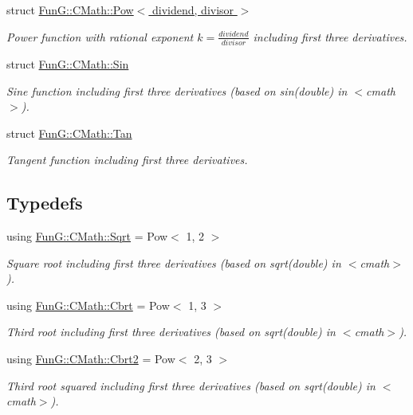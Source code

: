 \begin{DoxyCompactItemize}
struct \hyperlink{structFunG_1_1CMath_1_1Pow}{Fun\-G\-::\-C\-Math\-::\-Pow$<$ dividend, divisor $>$}
\begin{DoxyCompactList}\small\item\em Power function with rational exponent $ k = \frac{dividend}{divisor} $ including first three derivatives. \end{DoxyCompactList}\item 
struct \hyperlink{structFunG_1_1CMath_1_1Sin}{Fun\-G\-::\-C\-Math\-::\-Sin}
\begin{DoxyCompactList}\small\item\em Sine function including first three derivatives (based on sin(double) in $<$cmath$>$). \end{DoxyCompactList}\item 
struct \hyperlink{structFunG_1_1CMath_1_1Tan}{Fun\-G\-::\-C\-Math\-::\-Tan}
\begin{DoxyCompactList}\small\item\em Tangent function including first three derivatives. \end{DoxyCompactList}\end{DoxyCompactItemize}
\subsection*{Typedefs}
\begin{DoxyCompactItemize}
\item 
\hypertarget{group__CMathGroup_gabfd442927984a811e457687338274a79}{using \hyperlink{group__CMathGroup_gabfd442927984a811e457687338274a79}{Fun\-G\-::\-C\-Math\-::\-Sqrt} = Pow$<$ 1, 2 $>$}\label{group__CMathGroup_gabfd442927984a811e457687338274a79}

\begin{DoxyCompactList}\small\item\em Square root including first three derivatives (based on sqrt(double) in $<$cmath$>$). \end{DoxyCompactList}\item 
\hypertarget{group__CMathGroup_ga3c7a5774c97b2f2204b1a51f56f15c34}{using \hyperlink{group__CMathGroup_ga3c7a5774c97b2f2204b1a51f56f15c34}{Fun\-G\-::\-C\-Math\-::\-Cbrt} = Pow$<$ 1, 3 $>$}\label{group__CMathGroup_ga3c7a5774c97b2f2204b1a51f56f15c34}

\begin{DoxyCompactList}\small\item\em Third root including first three derivatives (based on sqrt(double) in $<$cmath$>$). \end{DoxyCompactList}\item 
\hypertarget{group__CMathGroup_ga50ace0152b7738d9f2e3bcebb6b0d6eb}{using \hyperlink{group__CMathGroup_ga50ace0152b7738d9f2e3bcebb6b0d6eb}{Fun\-G\-::\-C\-Math\-::\-Cbrt2} = Pow$<$ 2, 3 $>$}\label{group__CMathGroup_ga50ace0152b7738d9f2e3bcebb6b0d6eb}

\begin{DoxyCompactList}\small\item\em Third root squared including first three derivatives (based on sqrt(double) in $<$cmath$>$). \end{DoxyCompactList}\end{DoxyCompactItemize}
